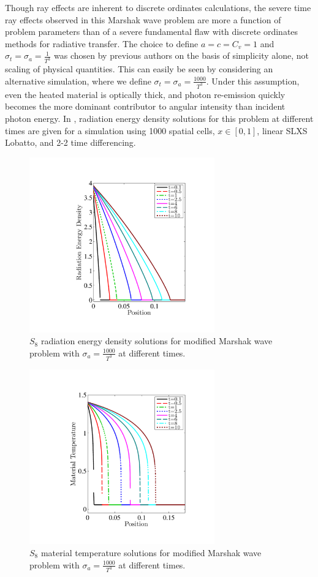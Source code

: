 Though ray effects are inherent to discrete ordinates calculations, the severe time ray effects observed in this Marshak wave problem are more a function of problem parameters than of a severe fundamental flaw with discrete ordinates methods for radiative transfer.
The choice to define $a=c=C_v=1$ and $\sigma_t = \sigma_a = \frac{1}{T^3}$ was chosen by previous authors on the basis of simplicity alone, not scaling of physical quantities.
This can easily be seen by considering an alternative simulation, where we define $\sigma_t = \sigma_a = \frac{1000}{T^3}$.
Under this assumption, even the heated material is optically thick, and photon re-emission quickly becomes the more dominant contributor to angular intensity than incident photon energy.
In , radiation energy density solutions for this problem at different times are given for a simulation using 1000 spatial cells, $x\in[0,1]$, linear SLXS Lobatto, and 2-2 time differencing.
\begin{figure}[!htp]
\centering
\includegraphics[width=8cm,trim=1in  0.5in 1in 0.75in,clip=true]{chapter6_grey_radtran/Dissertation_Data/More_Times_P1_S8_Time_Ray_Effects_Radiation_Cv1_SigA1000.pdf}
\caption{$S_{8}$ radiation energy density solutions for modified Marshak wave problem with $\sigma_a = \frac{1000}{T^3}$ at different times.}
\label{fig:sig_a_1000_radiation}
\end{figure}
\begin{figure}[!hbp]
\centering
\includegraphics[width=8cm,trim=1in  0.6in 1.0in 0.75in,clip=true]{chapter6_grey_radtran/Dissertation_Data/More_Times_P1_S8_Time_Ray_Effects_Temperature_Cv1_SigA1000.pdf}
\caption{$S_{8}$ material temperature solutions for modified Marshak wave problem with $\sigma_a = \frac{1000}{T^3}$ at different times.}
\label{fig:sig_a_1000_temperature}
\end{figure}
